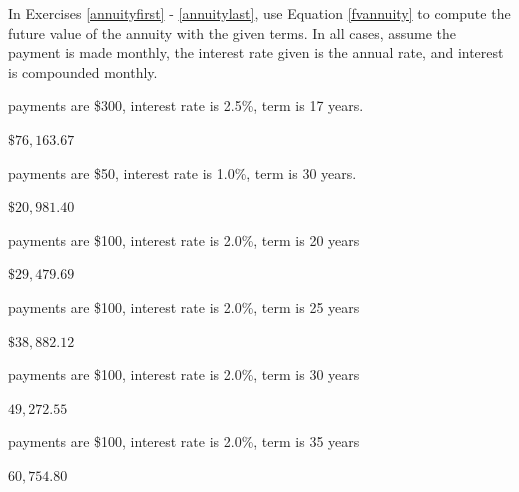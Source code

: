 \documentclass{ximera}
\begin{document}
\begin{question}
In Exercises \ref{annuityfirst} - \ref{annuitylast}, use Equation \ref{fvannuity} to compute the future value of the annuity with the given terms.  In all cases, assume the payment is made monthly, the interest rate given is the annual rate, and interest is compounded monthly.

\begin{problem}\label{annuityfirst}
payments are \$300, interest rate is 2.5\%, term is 17 years.

\begin{solution}
$\$76,\!163.67$
\end{solution}
\end{problem}

\begin{problem}
payments are \$50, interest rate is 1.0\%,  term is 30 years.  

\begin{solution}
$\$20,\!981.40$
\end{solution}
\end{problem} 

\begin{problem}
payments are \$100, interest rate is 2.0\%, term is 20 years 

\begin{solution}
$\$29,\!479.69$
\end{solution}
\end{problem}

\begin{problem}
payments are \$100, interest rate is 2.0\%,  term is 25 years

\begin{solution}
$\$38,\!882.12$
\end{solution}
\end{problem}

\begin{problem}
payments are \$100, interest rate is 2.0\%,  term is  30 years

\begin{solution}
$49,\!272.55$
\end{solution}
\end{problem} 

\begin{problem}\label{annuitylast}
payments are \$100, interest rate is 2.0\%,  term is  35 years

\begin{solution}
$60,\!754.80$
\end{solution}
\end{problem}

\end{question}
\end{document}

